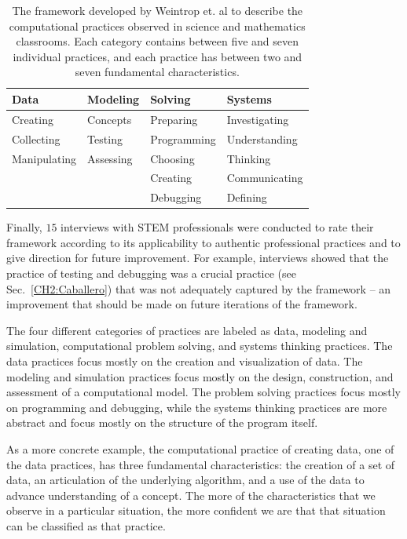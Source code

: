\documentclass{msuphddissertation}
\begin{document}
\begin{doublespace}
\begin{table}[hb]\centering
\begin{tabular}{llll}\hline\hline
Data         & Modeling     & Solving     & Systems       \\\hline
Creating     & Concepts      & Preparing   & Investigating \\
Collecting   & Testing      & Programming & Understanding \\
Manipulating & Assessing    & Choosing    & Thinking      \\
             &              & Creating    & Communicating \\
             &              & Debugging   & Defining      \\\hline\hline
\end{tabular}
\caption{The framework developed by Weintrop et. al to describe the computational practices observed in science and mathematics classrooms.  Each category contains between five and seven individual practices, and each practice has between two and seven fundamental characteristics.}\label{CH2:Framework}
\end{table}

Finally, $15$ interviews with STEM professionals were conducted to rate their framework according to its applicability to authentic professional practices and to give direction for future improvement.  For example, interviews showed that the practice of testing and debugging was a crucial practice (see Sec.~\ref{CH2:Caballero}) that was not adequately captured by the framework -- an improvement that should be made on future iterations of the framework.

The four different categories of practices are labeled as data, modeling and simulation, computational problem solving, and systems thinking practices.  The data practices focus mostly on the creation and visualization of data.  The modeling and simulation practices focus mostly on the design, construction, and assessment of a computational model.  The problem solving practices focus mostly on programming and debugging, while the systems thinking practices are more abstract and focus mostly on the structure of the program itself.

As a more concrete example, the computational practice of creating data, one of the data practices, has three fundamental characteristics: the creation of a set of data, an articulation of the underlying algorithm, and a use of the data to advance understanding of a concept.  The more of the characteristics that we observe in a particular situation, the more confident we are that that situation can be classified as that practice.


\end{doublespace}
\end{document}
